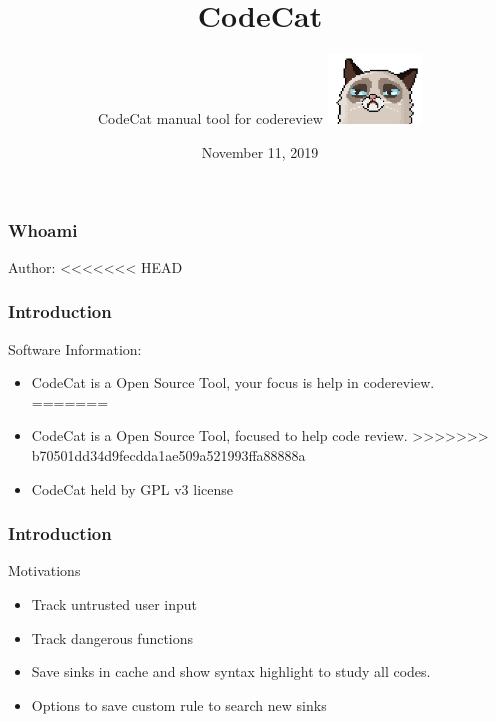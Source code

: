 \documentclass[serif,mathserif]{beamer}
\author[CodeCat v0.1]{ CodeCat manual tool for codereview \quad \includegraphics[width=2.5cm]{images/codecat00.png} }
\title[ Page \hspace{2em}\insertframenumber/\inserttotalframenumber]{CodeCat}
\date{November 11, 2019}
\institute{Antonio Costa - CoolerVoid - coolerlair[aT]gmail[DOt]com}
\begin{document}
\maketitle



\begin{frame}
  \frametitle{Whoami}
  Author:
<<<<<<< HEAD
  \begin{figure}[t]
    \centering
  \end{figure}
\end{frame}


\begin{frame}
  \frametitle{Introduction}
  Software Information:
  \begin{itemize}
<<<<<<< HEAD
  \item  CodeCat is a Open Source Tool, your focus is help in codereview. 
=======
  \item  CodeCat is a Open Source Tool, focused to help code review. 
>>>>>>> b70501dd34d9fecdda1ae509a521993ffa88888a
  \item  CodeCat held by GPL v3 license
  \end{itemize}
\end{frame}



\begin{frame}
  \frametitle{Introduction}
  Motivations
  \begin{itemize}
  \item  Track untrusted user input 
  \item  Track dangerous functions
  \item  Save sinks in cache and show syntax highlight to study all codes.
  \item  Options to save custom rule to search new sinks	  
  \end{itemize}
\end{frame}
\end{document}

